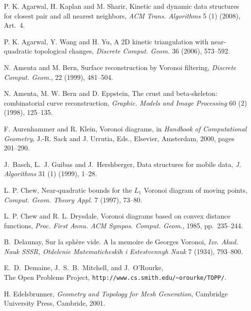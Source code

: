 \documentclass[letter,11pt]{article}
\begin{document}
\begin{thebibliography}{10}










P. K. Agarwal, H. Kaplan and M. Sharir, Kinetic and dynamic data
structures for closest pair and all nearest neighbors, \emph{ACM
Trans. Algorithms} 5 (1) (2008), Art.~4.

P. K. Agarwal, Y. Wang and H. Yu,
A 2D kinetic triangulation with near-quadratic topological changes,
\textit{Discrete Comput. Geom.} 36 (2006), 573--592.



N. Amenta and M. Bern, 
Surface reconstruction by Voronoi filtering,
{\em Discrete Comput. Geom.}, 22 (1999), 481--504.

N. Amenta, M. W. Bern and D. Eppstein, The crust and beta-skeleton: combinatorial curve reconstruction, 
{\it Graphic. Models and Image Processing} 60 (2) (1998), 125--135. 





F. Aurenhammer and R. Klein,
Voronoi diagrams,
in {\it Handbook of Computational Geometry},
J.-R. Sack and J. Urrutia, Eds.,
Elsevier, Amsterdam, 2000,
pages 201--290.

J.~Basch, L.~J. Guibas and J.~Hershberger,
Data structures for mobile data,
{\em J. Algorithms} 31 (1) (1999), 1--28.

L. P. Chew,
Near-quadratic bounds for the $L_1$ Voronoi diagram of moving points,
{\em Comput. Geom. Theory Appl.}  7 (1997), 73--80.

L. P. Chew and R. L. Drysdale,
Voronoi diagrams based on convex distance functions,
{\em Proc. First Annu. ACM Sympos. Comput. Geom.}, 1985, pp.~235--244.



B.~Delaunay,
Sur la sph{\`e}re vide. {A} la memoire de {Georges} {Voronoi},
{\em Izv. Akad. Nauk SSSR, Otdelenie Matematicheskih i Estestvennyh
Nauk} 7 (1934), 793--800.

E.~D.~Demaine, J.~S.~B.~Mitchell, and J.~O'Rourke,\\
The Open Problems Project,
\texttt{http://www.cs.smith.edu/\~{ }orourke/TOPP/}.

H. Edelsbrunner,
{\em Geometry and Topology for Mesh Generation},
Cambridge University Press, Cambride, 2001.


\end{thebibliography}
\end{document}
